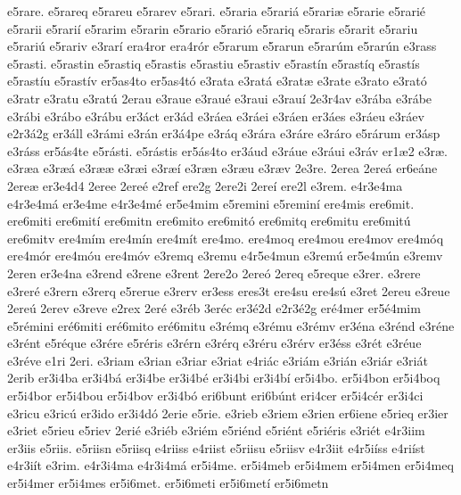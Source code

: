 {e5rare.
e5rareq
e5rareu
e5rarev
e5rari.
e5raria
e5rari^^e1
e5rari^^e6
e5rarie
e5rari^^e9
e5rarii
e5rari^^ed
e5rarim
e5rarin
e5rario
e5rari^^f3
e5rariq
e5raris
e5rarit
e5rariu
e5rari^^fa
e5rariv
e3rar^^ed
era4ror
era4r^^f3r
e5rarum
e5rarun
e5rar^^fam
e5rar^^fan
e3rass
e5rasti.
e5rastin
e5rastiq
e5rastis
e5rastiu
e5rastiv
e5rast^^edn
e5rast^^edq
e5rast^^eds
e5rast^^edu
e5rast^^edv
er5as4to
er5as4t^^f3
e3rata
e3rat^^e1
e3rat^^e6
e3rate
e3rato
e3rat^^f3
e3ratr
e3ratu
e3rat^^fa
2erau
e3raue
e3rau^^e9
e3raui
e3rau^^ed
2e3r4av
e3r^^e1ba
e3r^^e1be
e3r^^e1bi
e3r^^e1bo
e3r^^e1bu
er3^^e1ct
er3^^e1d
e3r^^e1ea
e3r^^e1ei
e3r^^e1en
er3^^e1es
e3r^^e1eu
e3r^^e1ev
e2r3^^e12g
er3^^e1ll
e3r^^e1mi
e3r^^e1n
er3^^e14pe
e3r^^e1q
e3r^^e1ra
e3r^^e1re
e3r^^e1ro
e5r^^e1rum
er3^^e1sp
e3r^^e1ss
er5^^e1s4te
e5r^^e1sti.
e5r^^e1stis
er5^^e1s4to
er3^^e1ud
e3r^^e1ue
e3r^^e1ui
e3r^^e1v
er1^^e62
e3r^^e6.
e3r^^e6a
e3r^^e6^^e1
e3r^^e6^^e6
e3r^^e6i
e3r^^e6^^ed
e3r^^e6n
e3r^^e6u
e3r^^e6v
2e3re.
2erea
2ere^^e1
er6e^^e1ne
2ere^^e6
er3e4d4
2eree
2ere^^e9
e2ref
ere2g
2ere2i
2ere^^ed
ere2l
e3rem.
e4r3e4ma
e4r3e4m^^e1
er3e4me
e4r3e4m^^e9
er5e4mim
e5remini
e5remin^^ed
ere4mis
ere6mit.
ere6miti
ere6mit^^ed
ere6mitn
ere6mito
ere6mit^^f3
ere6mitq
ere6mitu
ere6mit^^fa
ere6mitv
ere4m^^edm
ere4m^^edn
ere4m^^edt
ere4mo.
ere4moq
ere4mou
ere4mov
ere4m^^f3q
ere4m^^f3r
ere4m^^f3u
ere4m^^f3v
e3remq
e3remu
e4r5e4mun
e3rem^^fa
er5e4m^^fan
e3remv
2eren
er3e4na
e3rend
e3rene
e3rent
2ere2o
2ere^^f3
2ereq
e5reque
e3rer.
e3rere
e3rer^^e9
e3rern
e3rerq
e5rerue
e3rerv
er3ess
eres3t
ere4su
ere4s^^fa
e3ret
2ereu
e3reue
2ere^^fa
2erev
e3reve
e2rex
2er^^e9
e3r^^e9b
3er^^e9c
er3^^e92d
e2r3^^e92g
er^^e94mer
er5^^e94mim
e5r^^e9mini
er^^e96miti
er^^e96mito
er^^e96mitu
e3r^^e9mq
e3r^^e9mu
e3r^^e9mv
er3^^e9na
e3r^^e9nd
e3r^^e9ne
e3r^^e9nt
e5r^^e9que
e3r^^e9re
e5r^^e9ris
e3r^^e9rn
e3r^^e9rq
e3r^^e9ru
e3r^^e9rv
er3^^e9ss
e3r^^e9t
e3r^^e9ue
e3r^^e9ve
e1ri
2eri.
e3riam
e3rian
e3riar
e3riat
e4ri^^e1c
e3ri^^e1m
e3ri^^e1n
e3ri^^e1r
e3ri^^e1t
2erib
er3i4ba
er3i4b^^e1
er3i4be
er3i4b^^e9
er3i4bi
er3i4b^^ed
er5i4bo.
er5i4bon
er5i4boq
er5i4bor
er5i4bou
er5i4bov
er3i4b^^f3
eri6bunt
eri6b^^fant
eri4cer
er5i4c^^e9r
er3i4ci
e3ricu
e3ric^^fa
er3ido
er3i4d^^f3
2erie
e5rie.
e3rieb
e3riem
e3rien
er6iene
e5rieq
er3ier
e3riet
e5rieu
e5riev
2eri^^e9
e3ri^^e9b
e3ri^^e9m
e5ri^^e9nd
e5ri^^e9nt
e5ri^^e9ris
e3ri^^e9t
e4r3iim
er3iis
e5riis.
e5riisn
e5riisq
e4riiss
e4riist
e5riisu
e5riisv
e4r3iit
e4r5i^^edss
e4ri^^edst
e4r3i^^edt
e3rim.
e4r3i4ma
e4r3i4m^^e1
er5i4me.
er5i4meb
er5i4mem
er5i4men
er5i4meq
er5i4mer
er5i4mes
er5i6met.
er5i6meti
er5i6met^^ed
er5i6metn
}
